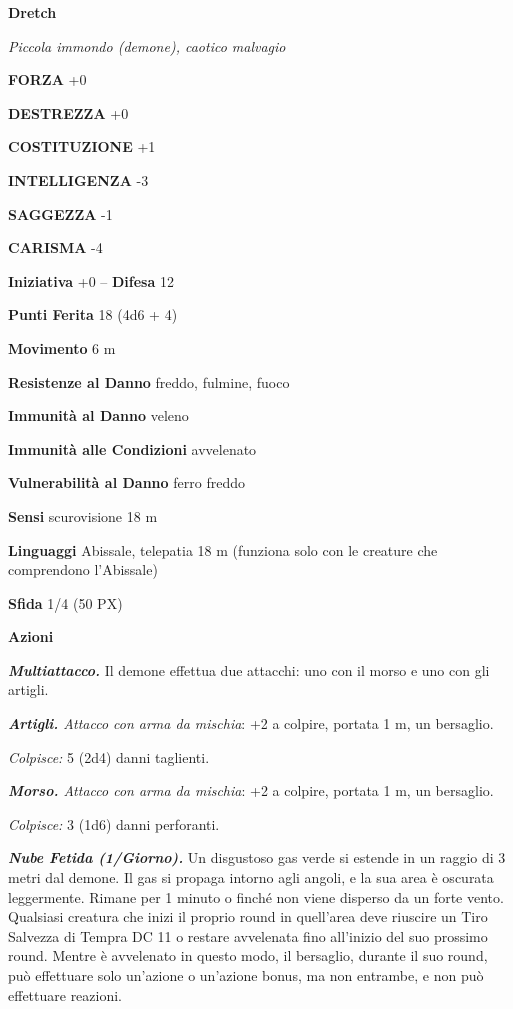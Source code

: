 \begin{multicols}{2}
	\medskip{}\textbf{Dretch}

	\textit{Piccola immondo (demone), caotico malvagio}

	\textbf{FORZA} +0

	\textbf{DESTREZZA} +0

	\textbf{COSTITUZIONE} +1

	\textbf{INTELLIGENZA} -3

	\textbf{SAGGEZZA} -1

	\textbf{CARISMA} -4

	\textbf{Iniziativa} +0 -- \textbf{Difesa} 12

	\textbf{Punti Ferita} 18 (4d6 + 4)

	\textbf{Movimento} 6 m

	\textbf{Resistenze al Danno} freddo, fulmine, fuoco

	\textbf{Immunità al Danno} veleno

	\textbf{Immunità alle Condizioni} avvelenato

	\textbf{Vulnerabilità al Danno} ferro freddo

	\textbf{Sensi} scurovisione 18 m

	\textbf{Linguaggi} Abissale, telepatia 18 m (funziona solo con le creature che comprendono l'Abissale)

	\textbf{Sfida} 1/4 (50 PX)

	\textbf{Azioni}

	\textit{\textbf{Multiattacco.}} Il demone effettua due attacchi: uno con il morso e uno con gli artigli.

	\textit{\textbf{Artigli.} Attacco con arma da mischia}: +2 a colpire, portata 1 m, un bersaglio.

	\textit{Colpisce:} 5 (2d4) danni taglienti.

	\textit{\textbf{Morso.} Attacco con arma da mischia}: +2 a colpire, portata 1 m, un bersaglio.

	\textit{Colpisce:} 3 (1d6) danni perforanti.

	\textit{\textbf{Nube Fetida (1/Giorno).}} Un disgustoso gas verde si estende in un raggio di 3 metri dal demone. Il gas si propaga intorno agli angoli, e la sua area è oscurata leggermente. Rimane per 1 minuto o finché non viene disperso da un forte vento. Qualsiasi creatura che inizi il proprio round in quell'area deve riuscire un Tiro Salvezza di Tempra DC 11 o restare avvelenata fino all'inizio del suo prossimo round. Mentre è avvelenato in questo modo, il bersaglio, durante il suo round, può effettuare solo un'azione o un'azione bonus, ma non entrambe, e non può effettuare reazioni.


\end{multicols}
